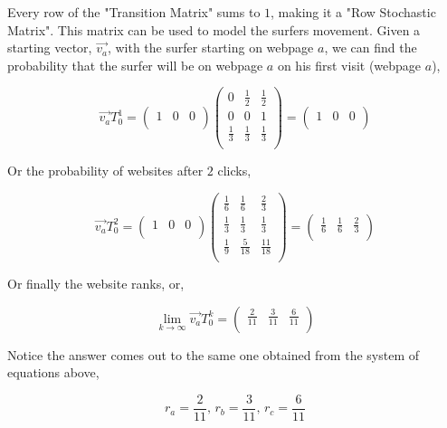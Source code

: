 \documentclass[12pt]{article}
\begin{document}
Every row of the "Transition Matrix" sums to $1$, making it a "Row Stochastic Matrix". This matrix can be used to model the surfers movement. Given a starting vector, $\vec{v_a}$, with the surfer starting on webpage $a$, we can find the probability that the surfer will be on webpage $a$ on his first visit (webpage $a$),

\[
\vec{v_a} T_0^1 =
\begin{pmatrix}
  1 & 0 & 0 \\
\end{pmatrix}
%
\begin{pmatrix}
  0 & \frac{1}{2} & \frac{1}{2} \\
  0 & 0 & 1  \\
  \frac{1}{3} & \frac{1}{3} & \frac{1}{3} \\
\end{pmatrix}
%
=
%
\begin{pmatrix}
  1 & 0 & 0 \\
\end{pmatrix}
\]

Or the probability of websites after $2$ clicks,

\[
\vec{v_a} T_0^2 =
\begin{pmatrix}
  1 & 0 & 0 \\
\end{pmatrix}
%
\begin{pmatrix}
  \frac{1}{6} & \frac{1}{6} & \frac{2}{3} \\
  \frac{1}{3} & \frac{1}{3} & \frac{1}{3}  \\
  \frac{1}{9} & \frac{5}{18} & \frac{11}{18} \\
\end{pmatrix}
%
=
%
\begin{pmatrix}
  \frac{1}{6} & \frac{1}{6} & \frac{2}{3} \\
\end{pmatrix}
\]


Or finally the website ranks, or,

\[
\lim_{k \to\infty} \vec{v_a} T_0^k =
%
\begin{pmatrix}
   \frac{2}{11} & \frac{3}{11} & \frac{6}{11} \\
\end{pmatrix}
\]

Notice the answer comes out to the same one obtained from the system of equations above,

\begin{equation}
	\nonumber r_a = \frac{2}{11}, \, r_b = \frac{3}{11}, \, r_c = \frac{6}{11}
\end{equation}
\end{document}
